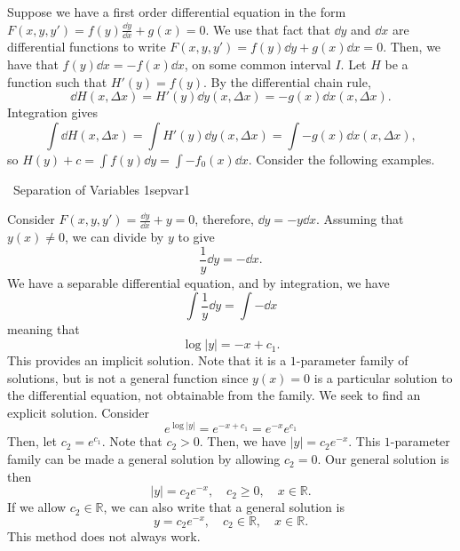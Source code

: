     Suppose we have a first order differential equation in the form \(F(x,y,y')=f(y)\frac{\dd y}{\dd x}+g(x)=0\). We use that fact that \(\dd y\) and \(\dd x\) are differential functions to write \(F(x,y,y')=f(y)\dd y+g(x)\dd x=0\). Then, we have that \(f(y)\dd x=-f(x)\dd x\), on some common interval \(I\). Let \(H\) be a function such that \(H'(y)=f(y)\). By the differential chain rule,
    \begin{equation*}
        \dd H(x,\Delta x)=H'(y)\dd y(x,\Delta x)=-g(x)\dd x(x,\Delta x).
    \end{equation*}
    Integration gives
    \begin{equation*}
        \int \dd H(x,\Delta x) = \int H'(y)\dd y(x,\Delta x)=\int -g(x)\dd x(x,\Delta x),
    \end{equation*}
    so \(H(y)+c=\int f(y)\dd y=\int-f_0(x)\dd x\). Consider the following examples.
    \begin{example}{\Difficulty\,\Difficulty\,\,Separation of Variables 1}{sepvar1}

        Consider \(F(x,y,y')=\frac{\dd y}{\dd x}+y=0\), therefore, \(\dd y=-y\dd x\). Assuming that \(y(x)\neq0\), we can divide by \(y\) to give
        \begin{equation*}
            \frac{1}{y}\dd y=-\dd x.
        \end{equation*} 
        We have a separable differential equation, and by integration, we have
        \begin{equation*}
            \int \frac{1}{y}\dd y=\int -\dd x
        \end{equation*}
        meaning that
        \begin{equation*}
            \log|y|=-x+c_1.
        \end{equation*}
        This provides an implicit solution. Note that it is a \(1\)-parameter family of solutions, but is not a general function since \(y(x)=0\) is a particular solution to the differential equation, not obtainable from the family. We seek to find an explicit solution. Consider
        \begin{equation*}
            e^{\log|y|}=e^{-x+c_1}=e^{-x}e^{c_1}
        \end{equation*}
        Then, let \(c_2=e^{c_1}\). Note that \(c_2>0\). Then, we have \(|y|=c_2e^{-x}\). This \(1\)-parameter family can be made a general solution by allowing \(c_2=0\). Our general solution is then
        \begin{equation*}
            |y|=c_2e^{-x},\quad c_2\geq0, \quad x\in\mathbb{R}.
        \end{equation*}
        If we allow \(c_2\in\mathbb{R}\), we can also write that a general solution is
        \begin{equation*}
            y=c_2e^{-x},\quad c_2\in\mathbb{R},\quad x\in\mathbb{R}.
        \end{equation*}
        This method does not always work.
        
    \end{example}
